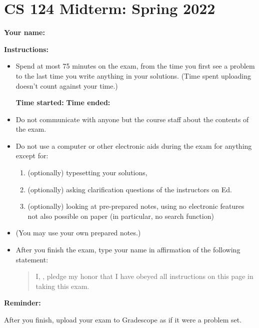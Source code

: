 \documentclass[11pt]{article}
\begin{document}
	
	\section*{CS 124 Midterm: Spring 2022}
 		
	\textbf{Your name:} 	

	\textbf{Instructions: } 
	
	\begin{itemize}
		\item
		Spend at most 75 minutes on the exam, from the time you first see a problem to the last time you write anything in your solutions. (Time spent uploading doesn't count against your time.)
		
		{\bf Time started: } \uline{\hfill} {\bf Time ended: } \uline{\hfill} \phantom{x}
		
\item Do not communicate with anyone but the course staff about the contents of the exam.
\item Do not use a computer or other electronic aids during the exam for anything except for:
\begin{enumerate}
\item (optionally) typesetting your solutions,
\item (optionally) asking clarification questions of the instructors on Ed.
\item (optionally) looking at pre-prepared notes, using no electronic features not also possible on paper (in particular, no search function)
\end{enumerate}
\item (You may use your own prepared notes.)
		\item After you finish the exam, type your name in affirmation of the following statement:

		\begin{quote}
			I, \uline{
			\hspace{5in}
			}, 
			pledge my honor that I have obeyed all instructions on this page in taking this exam.
		\end{quote}
	\end{itemize}
	
	
	\noindent\textbf{Reminder:} 
	
	After you finish, upload your exam to Gradescope as if it were a problem set.
	
\end{document}
